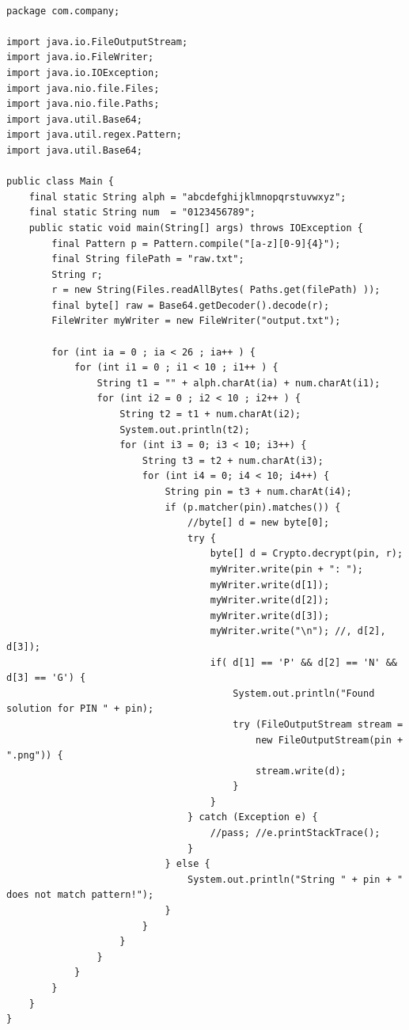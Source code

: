 \documentclass[english,a4paper,nols,noindent]{tufte-handout}
\begin{document}
\begin{verbatim}

package com.company;

import java.io.FileOutputStream;
import java.io.FileWriter;
import java.io.IOException;
import java.nio.file.Files;
import java.nio.file.Paths;
import java.util.Base64;
import java.util.regex.Pattern;
import java.util.Base64;

public class Main {
    final static String alph = "abcdefghijklmnopqrstuvwxyz";
    final static String num  = "0123456789";
    public static void main(String[] args) throws IOException {
        final Pattern p = Pattern.compile("[a-z][0-9]{4}");
        final String filePath = "raw.txt";
        String r;
        r = new String(Files.readAllBytes( Paths.get(filePath) ));
        final byte[] raw = Base64.getDecoder().decode(r);
        FileWriter myWriter = new FileWriter("output.txt");

        for (int ia = 0 ; ia < 26 ; ia++ ) {
            for (int i1 = 0 ; i1 < 10 ; i1++ ) {
                String t1 = "" + alph.charAt(ia) + num.charAt(i1);
                for (int i2 = 0 ; i2 < 10 ; i2++ ) {
                    String t2 = t1 + num.charAt(i2);
                    System.out.println(t2);
                    for (int i3 = 0; i3 < 10; i3++) {
                        String t3 = t2 + num.charAt(i3);
                        for (int i4 = 0; i4 < 10; i4++) {
                            String pin = t3 + num.charAt(i4);
                            if (p.matcher(pin).matches()) {
                                //byte[] d = new byte[0];
                                try {
                                    byte[] d = Crypto.decrypt(pin, r);
                                    myWriter.write(pin + ": ");
                                    myWriter.write(d[1]);
                                    myWriter.write(d[2]);
                                    myWriter.write(d[3]);
                                    myWriter.write("\n"); //, d[2], d[3]);
                                    if( d[1] == 'P' && d[2] == 'N' && d[3] == 'G') {
                                        System.out.println("Found solution for PIN " + pin);
                                        try (FileOutputStream stream =
                                            new FileOutputStream(pin + ".png")) {
                                            stream.write(d);
                                        }
                                    }
                                } catch (Exception e) {
                                    //pass; //e.printStackTrace();
                                }
                            } else {
                                System.out.println("String " + pin + " does not match pattern!");
                            }
                        }
                    }
                }
            }
        }
    }
}
\end{verbatim}
\end{document}
